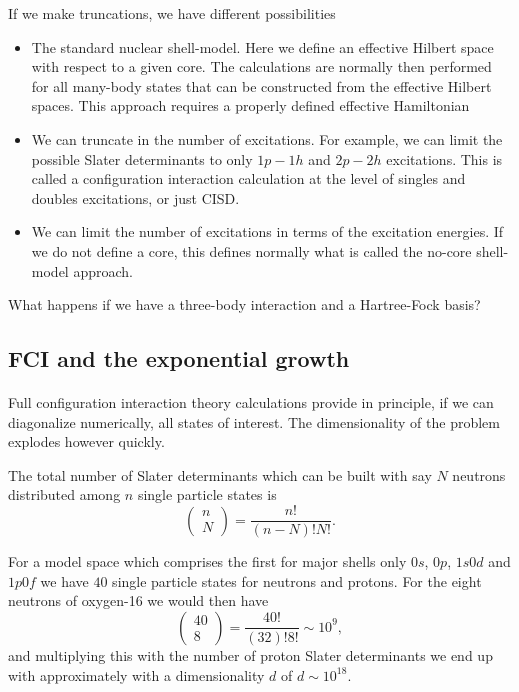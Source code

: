 \documentclass[%
oneside,                 %
final,                   %
10pt]{article}
\begin{document}
If we make truncations, we have different possibilities

\begin{itemize}
\item The standard nuclear shell-model. Here we define an effective Hilbert space with respect to a given core. The calculations are normally then performed for all many-body states that can be constructed from the effective Hilbert spaces. This approach requires a properly defined effective Hamiltonian

\item We can truncate in the number of excitations. For example, we can limit the possible Slater determinants to only $1p-1h$ and $2p-2h$ excitations. This is called a configuration interaction calculation at the level of singles and doubles excitations, or just CISD. 

\item We can limit the number of excitations in terms of the excitation energies. If we do not define a core, this defines normally what is called the no-core shell-model approach. 
\end{itemize}

\noindent
What happens if we have a three-body interaction and a Hartree-Fock basis?



\subsection*{FCI and the exponential growth}

\paragraph{}
Full configuration interaction theory calculations provide in principle, if we can diagonalize numerically, all states of interest. The dimensionality of the problem explodes however quickly.

The total number of Slater determinants which can be built with say $N$ neutrons distributed among $n$ single particle states is
\[
\left (\begin{array}{c} n \\ N\end{array} \right) =\frac{n!}{(n-N)!N!}. 
\]

For a model space which comprises the first for major shells only $0s$, $0p$, $1s0d$ and $1p0f$ we have $40$ single particle states for neutrons and protons.  For the eight neutrons of oxygen-16 we would then have
\[
\left (\begin{array}{c} 40 \\ 8\end{array} \right) =\frac{40!}{(32)!8!}\sim 10^{9}, 
\]
and multiplying this with the number of proton Slater determinants we end up with approximately with a dimensionality $d$ of $d\sim 10^{18}$.
\end{document}

